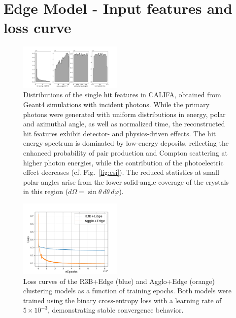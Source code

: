 \documentclass[review,sort&compress]{elsarticle}
\begin{document}
\appendix

\section{Edge Model - Input features and loss curve}

\begin{figure}[!h]
        \centering
        \includegraphics[width=0.45\textwidth]{input_features_distribution.png}

		\caption{
		Distributions of the single hit features in CALIFA, obtained from Geant4 simulations with incident photons. While the primary photons were generated with uniform distributions in energy, polar and azimuthal angle, as well as normalized time, the reconstructed hit features exhibit detector- and physics-driven effects. The hit energy spectrum is dominated by low-energy deposits, reflecting the enhanced probability of pair production and Compton scattering at higher photon energies, while the contribution of the photoelectric effect decreases (cf. Fig.~\ref{fig:csi}). The reduced statistics at small polar angles arise from the lower solid-angle coverage of the crystals in this region ($d\Omega = \sin\theta\, d\theta\, d\varphi$).
		}

        \label{fig:input_features}%
\end{figure}

\begin{figure}[!h]
        \centering
        \includegraphics[width=0.45\textwidth]{loss_curve.png}

		\caption{
		Loss curves of the R3B+Edge (blue) and Agglo+Edge (orange) clustering models as a function of training epochs. Both models were trained using the binary cross-entropy loss with a learning rate of $5\times10^{-3}$, demonstrating stable convergence behavior.	
		}

        \label{fig:loss_curve}%
\end{figure}
\end{document}
